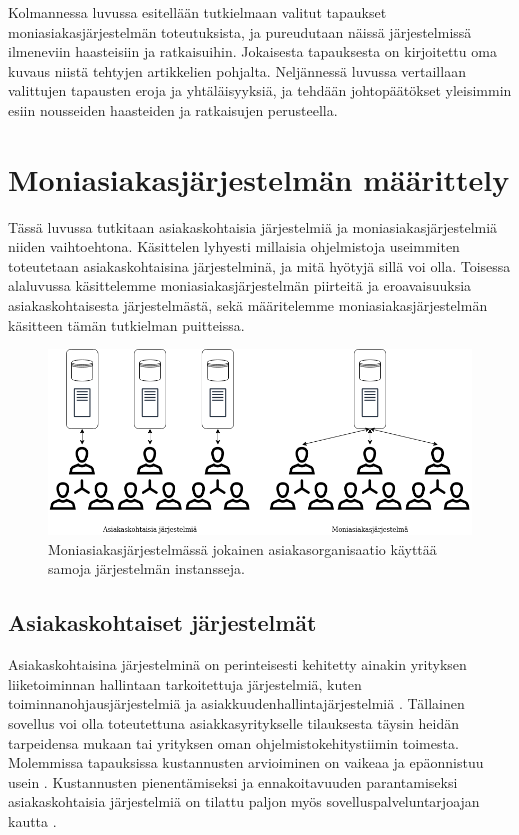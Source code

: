 Kolmannessa luvussa esitellään tutkielmaan valitut tapaukset moniasiakasjärjestelmän toteutuksista, ja pureudutaan näissä järjestelmissä ilmeneviin haasteisiin ja ratkaisuihin. Jokaisesta tapauksesta on kirjoitettu oma kuvaus niistä tehtyjen artikkelien pohjalta. Neljännessä luvussa vertaillaan valittujen tapausten eroja ja yhtäläisyyksiä, ja tehdään johtopäätökset yleisimmin esiin nousseiden haasteiden ja ratkaisujen perusteella.

\chapter{Moniasiakasjärjestelmän määrittely}
Tässä luvussa tutkitaan asiakaskohtaisia järjestelmiä ja moniasiakasjärjestelmiä niiden vaihtoehtona. Käsittelen lyhyesti millaisia ohjelmistoja useimmiten toteutetaan asiakaskohtaisina järjestelminä, ja mitä hyötyjä sillä voi olla. Toisessa alaluvussa käsittelemme moniasiakasjärjestelmän piirteitä ja eroavaisuuksia asiakaskohtaisesta järjestelmästä, sekä määritelemme moniasiakasjärjestelmän käsitteen tämän tutkielman puitteissa.

\begin{figure}[h]
  \centering
  \includegraphics[width=16cm]{kuvat/yksi_vs_moni.png}
  \caption{Moniasiakasjärjestelmässä jokainen asiakasorganisaatio käyttää samoja järjestelmän instansseja.}
\end{figure}


\section{Asiakaskohtaiset järjestelmät}
Asiakaskohtaisina järjestelminä on perinteisesti kehitetty ainakin yrityksen liiketoiminnan hallintaan tarkoitettuja järjestelmiä, kuten toiminnanohjausjärjestelmiä ja asiakkuudenhallintajärjestelmiä \cite{stamelos2003estimating, kaplan2007saas}. Tällainen sovellus voi olla toteutettuna asiakkasyritykselle tilauksesta täysin heidän tarpeidensa mukaan tai yrityksen oman ohjelmistokehitystiimin toimesta. Molemmissa tapauksissa kustannusten arvioiminen on vaikeaa ja epäonnistuu usein \cite{stamelos2003estimating}. Kustannusten pienentämiseksi ja ennakoitavuuden parantamiseksi asiakaskohtaisia järjestelmiä on tilattu paljon myös sovelluspalveluntarjoajan kautta \cite{kaplan2007saas}.

